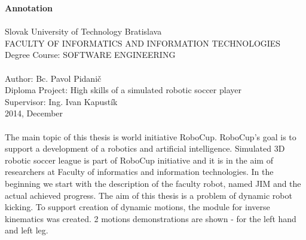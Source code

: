 \begin{titlepage}
\large \textbf{Annotation} \\ \\
\normalsize
Slovak University of Technology Bratislava \\
FACULTY OF INFORMATICS AND INFORMATION TECHNOLOGIES \\
Degree Course: SOFTWARE ENGINEERING  \\
 \\
Author: Bc. Pavol Pidanič \\
Diploma Project: High skills of a simulated robotic soccer player \\ 
Supervisor: Ing. Ivan Kapustík  \\
2014, December \\
\\
The main topic of this thesis is world initiative RoboCup. RoboCup's goal is to support a development of a robotics and artificial intelligence. Simulated 3D robotic soccer league is part of RoboCup initiative and it is in the aim of researchers at Faculty of informatics and information technologies. In the beginning we start with the description of the faculty robot, named JIM and the actual achieved progress. The aim of this thesis is a problem of dynamic robot kicking. To support creation of dynamic motions, the module for inverse kinematics was created. 2 motions demonstrations are shown - for the left hand and left leg.



\end{titlepage}